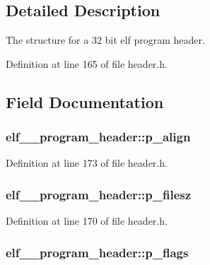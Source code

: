 \subsection{Detailed Description}
The structure for a 32 bit elf program header. 

Definition at line 165 of file header.h.



\subsection{Field Documentation}
\hypertarget{structelf__32__program__header_a2a8ee61f9995f7be7f3fedf4b7ba12c6}{
\subsubsection[{p\_\-align}]{ {\bf elf\_\_\-program\_\-header::p\_\-align}}}
\label{structelf__32__program__header_a2a8ee61f9995f7be7f3fedf4b7ba12c6}


Definition at line 173 of file header.h.

\hypertarget{structelf__32__program__header_adea383271339e61d6dc701a292fd6596}{
\subsubsection[{p\_\-filesz}]{ {\bf elf\_\_\-program\_\-header::p\_\-filesz}}}
\label{structelf__32__program__header_adea383271339e61d6dc701a292fd6596}


Definition at line 170 of file header.h.

\hypertarget{structelf__32__program__header_a98c788bfdf95178f0e590c086002eaf9}{
\subsubsection[{p\_\-flags}]{ {\bf elf\_\_\-program\_\-header::p\_\-flags}}}
\label{structelf__32__program__header_a98c788bfdf95178f0e590c086002eaf9}


